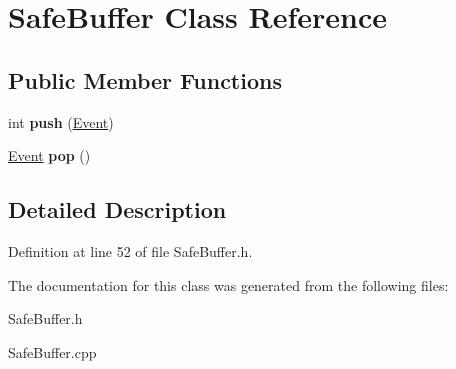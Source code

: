 \hypertarget{class_safe_buffer}{}\section{Safe\+Buffer Class Reference}
\label{class_safe_buffer}
\subsection*{Public Member Functions}
\begin{DoxyCompactItemize}
\item 
\mbox{\label{class_safe_buffer_ac3ed0799ec2e84c97e36b22c83f7abf5}} 
int {\bfseries push} (\hyperlink{class_event}{Event})
\item 
\mbox{\label{class_safe_buffer_a90a33fca4d838f7c0eef6e8557f3c281}} 
\hyperlink{class_event}{Event} {\bfseries pop} ()
\end{DoxyCompactItemize}


\subsection{Detailed Description}


Definition at line 52 of file Safe\+Buffer.\+h.



The documentation for this class was generated from the following files\+:\begin{DoxyCompactItemize}
\item 
Safe\+Buffer.\+h\item 
Safe\+Buffer.\+cpp\end{DoxyCompactItemize}
